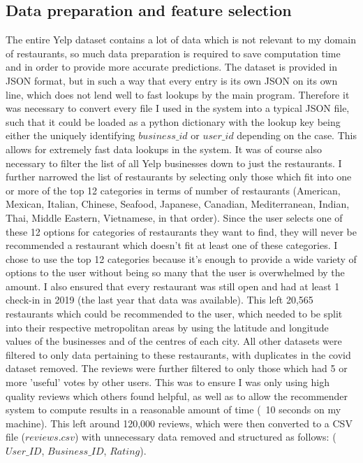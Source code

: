 \documentclass[conference]{IEEEtran}
\begin{document}
\subsection{Data preparation and feature selection}
The entire Yelp dataset contains a lot of data which is not relevant to my domain of restaurants, so much data 
preparation is required to save computation time and in order to provide more accurate predictions. 
The dataset is provided in JSON format, but in such a way that every entry is its own JSON on its own line, 
which does not lend well to fast lookups by the main program. 
Therefore it was necessary to convert every file I used in the system into a typical JSON file, such that it could 
be loaded as a python dictionary with the lookup key being either the uniquely identifying $business\_id$ or 
$user\_id$ depending on the case. 
This allows for extremely fast data lookups in the system. 
It was of course also necessary to filter the list of all Yelp businesses down to just the restaurants. 
I further narrowed the list of restaurants by selecting only those which fit into one or more of the top 12 
categories in terms of number of restaurants (American, Mexican, Italian, Chinese, Seafood, Japanese, Canadian, 
Mediterranean, Indian, Thai, Middle Eastern, Vietnamese, in that order). 
Since the user selects one of these 12 options for categories of restaurants they want to find, they will 
never be recommended a restaurant which doesn't fit at least one of these categories. 
I chose to use the top 12 categories because it's enough to provide a wide variety of options to the user without 
being so many that the user is overwhelmed by the amount. 
I also ensured that every restaurant was still open and had at least 1 check-in in 2019 (the last year that 
data was available). 
This left 20,565 restaurants which could be recommended to the user, which needed to be split into their respective 
metropolitan areas by using the latitude and longitude values of the businesses and of the centres of each city. 
All other datasets were filtered to only data pertaining to these restaurants, with duplicates in the 
covid dataset removed. 
The reviews were further filtered to only those which had 5 or more 'useful' votes by other users. 
This was to ensure I was only using high quality reviews which others found helpful, as well as to allow the 
recommender system to compute results in a reasonable amount of time (~10 seconds on my machine). 
This left around 120,000 reviews, which were then converted to a CSV file ($reviews.csv$) with unnecessary data 
removed and structured as follows: ($User\_ID$, $Business\_ID$, $Rating$). 
\end{document}
